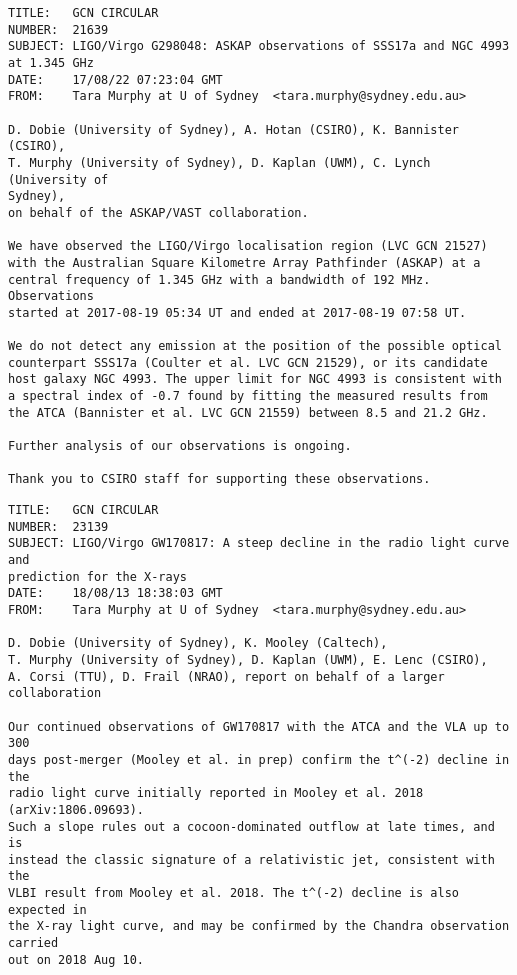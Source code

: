\begin{verbatim}
TITLE:   GCN CIRCULAR
NUMBER:  21639
SUBJECT: LIGO/Virgo G298048: ASKAP observations of SSS17a and NGC 4993 at 1.345 GHz
DATE:    17/08/22 07:23:04 GMT
FROM:    Tara Murphy at U of Sydney  <tara.murphy@sydney.edu.au>

D. Dobie (University of Sydney), A. Hotan (CSIRO), K. Bannister (CSIRO),
T. Murphy (University of Sydney), D. Kaplan (UWM), C. Lynch (University of
Sydney),
on behalf of the ASKAP/VAST collaboration.

We have observed the LIGO/Virgo localisation region (LVC GCN 21527)
with the Australian Square Kilometre Array Pathfinder (ASKAP) at a
central frequency of 1.345 GHz with a bandwidth of 192 MHz. Observations
started at 2017-08-19 05:34 UT and ended at 2017-08-19 07:58 UT.

We do not detect any emission at the position of the possible optical
counterpart SSS17a (Coulter et al. LVC GCN 21529), or its candidate
host galaxy NGC 4993. The upper limit for NGC 4993 is consistent with
a spectral index of -0.7 found by fitting the measured results from
the ATCA (Bannister et al. LVC GCN 21559) between 8.5 and 21.2 GHz.

Further analysis of our observations is ongoing.

Thank you to CSIRO staff for supporting these observations.
\end{verbatim}
\vspace{50pt}
\begin{verbatim}
TITLE:   GCN CIRCULAR
NUMBER:  23139
SUBJECT: LIGO/Virgo GW170817: A steep decline in the radio light curve and
prediction for the X-rays
DATE:    18/08/13 18:38:03 GMT
FROM:    Tara Murphy at U of Sydney  <tara.murphy@sydney.edu.au>

D. Dobie (University of Sydney), K. Mooley (Caltech),
T. Murphy (University of Sydney), D. Kaplan (UWM), E. Lenc (CSIRO),
A. Corsi (TTU), D. Frail (NRAO), report on behalf of a larger collaboration

Our continued observations of GW170817 with the ATCA and the VLA up to 300
days post-merger (Mooley et al. in prep) confirm the t^(-2) decline in the
radio light curve initially reported in Mooley et al. 2018 (arXiv:1806.09693).
Such a slope rules out a cocoon-dominated outflow at late times, and is
instead the classic signature of a relativistic jet, consistent with the
VLBI result from Mooley et al. 2018. The t^(-2) decline is also expected in
the X-ray light curve, and may be confirmed by the Chandra observation carried
out on 2018 Aug 10.
\end{verbatim}
